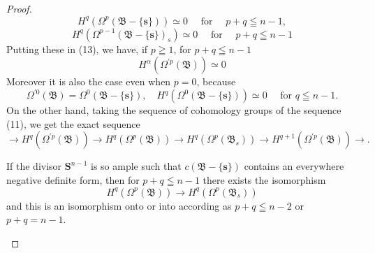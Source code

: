 \documentclass[lang=en,12pt]{beautybook}
\begin{document}
\begin{proof}
\begin{equation*}
H^q\left(\Omega^p(\mathfrak{B}-\{\boldsymbol{s}\})\right) \simeq 0 \quad \text { for } \quad p+q \leqq n-1,
\end{equation*}
\begin{equation*}
  H^q\left(\Omega^{p-1}(\mathfrak{B}-\{\boldsymbol{s}\})_s\right) \simeq 0 \quad \text { for } \quad p+q \leqq n-1
  \end{equation*}
  Putting these in (13), we have, if $p \geqq 1$, for $p+q \leqq n-1$
  \begin{equation*}
  H^\alpha\left(\Omega^{\prime p}(\mathfrak{B})\right) \simeq 0
  \end{equation*}
  Moreover it is also the case even when $p=0$, because 
  $$\Omega^{\prime 0}(\mathfrak{B})=\Omega^0(\mathfrak{B}-\{\boldsymbol{s}\}), \quad H^q\left(\Omega^0(\mathfrak{B}-\{\boldsymbol{s}\})\right) \simeq 0 \quad\text{ for }q \leqq n-1.$$
  On the other hand, taking the sequence of cohomology groups of the sequence (11), we get the exact sequence
  \begin{equation*}
  \rightarrow H^q\left(\Omega^{\prime p}(\mathfrak{B})\right) \rightarrow H^q\left(\Omega^p(\mathfrak{B})\right) \rightarrow H^q\left(\Omega^p\left(\mathfrak{B}_s\right)\right) \rightarrow H^{q+1}\left(\Omega^{\prime p}(\mathfrak{B})\right) \rightarrow .
  \end{equation*}

  \begin{theorem}
  If the divisor $\boldsymbol{S}^{n-1}$ is so ample such that $c(\mathfrak{B}-\{\boldsymbol{s}\})$ contains an everywhere negative definite form, then for $p+q \leqq n-1$ there exists the isomorphism
  \begin{equation*}
  H^q\left(\Omega^p(\mathfrak{B})\right) \rightarrow H^q\left(\Omega^p\left(\mathfrak{B}_s\right)\right)
  \end{equation*}
  and this is an isomorphism onto or into according as $p+q \leqq n-2$ or $p+q=n-1$.
  \end{theorem}
  

\end{proof}
\end{document}
